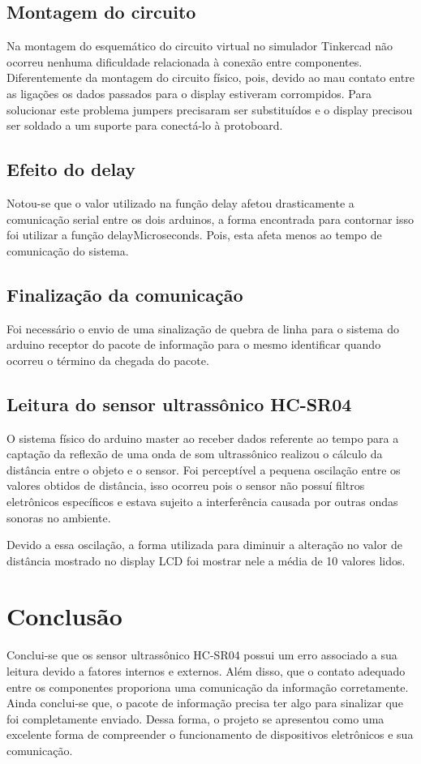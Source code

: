 \documentclass[conference]{IEEEtran}
\begin{document}
\subsection{Montagem do circuito}

Na montagem do esquemático do circuito virtual no simulador Tinkercad não ocorreu nenhuma dificuldade relacionada à conexão entre componentes.
Diferentemente da montagem do circuito físico, pois, devido ao mau contato entre as ligações os dados passados para o display estiveram corrompidos. Para solucionar este problema jumpers precisaram ser substituídos
e o display precisou ser soldado a um suporte para conectá-lo à protoboard.

\subsection{Efeito do delay}
Notou-se que o valor utilizado na função delay afetou drasticamente a comunicação serial entre os dois arduinos, a forma encontrada para contornar isso foi utilizar a função delayMicroseconds. Pois, esta afeta menos ao tempo de comunicação do sistema.

\subsection{Finalização da comunicação}
Foi necessário o envio de uma sinalização de quebra de linha para o sistema do arduino receptor do pacote de informação para o mesmo identificar quando ocorreu o término da chegada do pacote.

\subsection{Leitura do sensor ultrassônico HC-SR04}

O sistema físico do arduino master ao receber dados referente ao tempo para a captação da reflexão de uma onda de som ultrassônico realizou o cálculo da distância entre o objeto e o sensor.
Foi perceptível a pequena oscilação entre os valores obtidos de distância, isso ocorreu pois o sensor não possuí filtros eletrônicos específicos e estava sujeito a interferência causada por outras ondas sonoras no ambiente.

Devido a essa oscilação, a forma utilizada para diminuir a alteração no valor de distância mostrado no display LCD foi mostrar nele a média de 10 valores lidos.

\section{Conclusão}
Conclui-se que os sensor ultrassônico HC-SR04 possui um erro associado a sua leitura devido a fatores internos e externos.
Além disso, que o contato adequado entre os componentes proporiona uma comunicação da informação corretamente. Ainda conclui-se que, o pacote de informação precisa ter algo para sinalizar que foi completamente enviado.
Dessa forma, o projeto se apresentou como uma excelente forma de compreender o funcionamento de dispositivos eletrônicos e sua comunicação.



\end{document}
